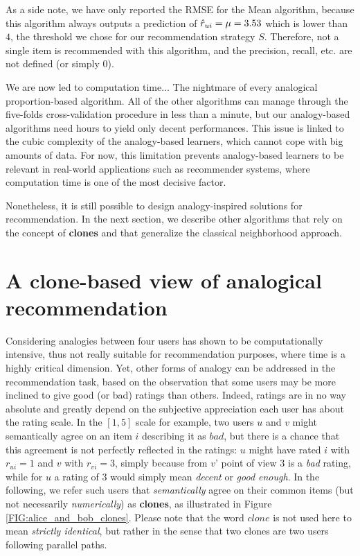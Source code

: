 As a side note, we have only reported the RMSE for the Mean algorithm, because
this algorithm always outputs a prediction of $\hat{r}_{ui} = \mu = 3.53$ which is
lower than $4$, the threshold we chose for our recommendation strategy $S$.
Therefore, not a single item is recommended with this algorithm, and the
precision, recall, etc. are not defined (or simply 0).

We are now led to computation time... The nightmare of every analogical
proportion-based algorithm. All of the other algorithms can manage through the
five-folds cross-validation procedure in less than a minute, but our
analogy-based algorithms need hours to yield only decent performances. This
issue is linked to the cubic complexity of the analogy-based learners, which
cannot cope with big amounts of data. For now, this limitation prevents
analogy-based learners to be relevant in real-world applications such as
recommender systems, where computation time is one of the most decisive factor.

Nonetheless, it is still possible to design analogy-inspired solutions for
recommendation. In the next section, we describe other algorithms that rely on
the concept of \textbf{clones} and that generalize the classical neighborhood
approach.

\section{A clone-based view of analogical recommendation}
\label{SEC:clone_based_view}

Considering analogies between four users has shown to be computationally
intensive, thus not really suitable for recommendation purposes, where time is
a highly critical dimension. Yet, other forms of analogy can be addressed in
the recommendation task, based on the observation that some users may be more
inclined to give good (or bad) ratings than others. Indeed, ratings are in no
way absolute and greatly depend on the subjective appreciation each user has
about the rating scale. In the $[1, 5]$ scale for example, two users $u$ and
$v$ might semantically agree on an item $i$ describing it as $bad$, but there
is a chance that this agreement is not perfectly reflected in the ratings: $u$
might have rated $i$ with $r_{ui} = 1$ and $v$ with $r_{vi} = 3$, simply
because from $v$' point of view $3$ is a \textit{bad} rating, while for $u$ a
rating of $3$ would simply mean \textit{decent} or \textit{good enough}.  In
the following, we refer such users that \textit{semantically} agree on their
common items (but not necessarily \textit{numerically}) as \textbf{clones}, as
illustrated in Figure \ref{FIG:alice_and_bob_clones}. Please note that the word
$clone$ is not used here to mean \textit{strictly identical}, but rather in the
sense that two clones are two users following parallel paths.

